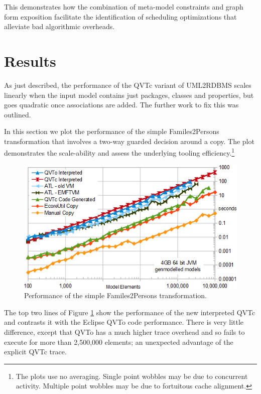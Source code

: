 \documentclass{llncs}
\begin{document}
This demonstrates how the combination of meta-model constraints and graph form exposition facilitate the identification of scheduling optimizations that alleviate bad algorithmic overheads.

\section{Results}\label{Results}

As just described, the performance of the QVTc variant of UML2RDBMS scales linearly when the input model contains just packages, classes and properties, but goes quadratic once associations are added. The further work to fix this was outlined.

In this section we plot the performance of the simple Familes2Persons transformation that involves a two-way guarded decision around a copy. The plot demonstrates the scale-ability and assess the underlying tooling efficiency.\footnote{The plots use no averaging. Single point wobbles may be due to concurrent activity. Multiple point wobbles may be due to fortuitous cache alignment.}

\begin{figure}[h]
	\centering
	\includegraphics[width=1.0\textwidth]{Families2Persons.png}
	\caption{Performance of the simple Familes2Persons transformation.}
	\label{fig:Families2Persons}
\end{figure}

The top two lines of Figure \ref{fig:Families2Persons} show the performance of the new interpreted QVTc and contrasts it with the Eclipse QVTo code performance. There is very little difference, except that QVTo has a much higher trace overhead and so fails to execute for more than 2,500,000 elements; an unexpected advantage of the explicit QVTc trace.
\end{document}
